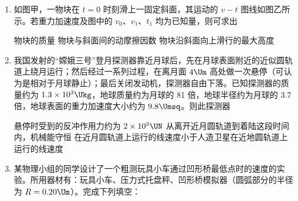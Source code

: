\documentclass[\gkver]{gaokaozhenti}
\begin{document}
\begin{enumerate}
\onepicture[w=3.25cm]{}

{圆盘内的涡电流产生的磁场导致磁针转动}
{在圆盘转动的过程中，磁针的磁场穿过整个圆盘的磁通量发生了变化}
{圆盘中的自由电子随圆盘一起运动形成电流，此电流产生的磁场导致磁针转动}


\item
如图甲，一物块在 $t=0$ 时刻滑上一固定斜面，其运动的 $v-t$ 图线如图乙所示。若重力加速度及图中的 $v_{0}$、$v_{1}$、$t_{1}$ 均为已知量，则可求出

\twopicture[numA={甲}, numB={乙}, labelA=2015全国课标Ⅰ20a, labelB=2015全国课标Ⅰ20b, wA=2.81cm, wB=3.51cm]
{}
{}

{物块的质量}
{物块与斜面间的动摩擦因数}
{物块沿斜面向上滑行的最大高度}


\item
我国发射的“嫦娥三号”登月探测器靠近月球后，先在月球表面附近的近似圆轨道上绕月运行；然后经过一系列过程，在离月面 $4\Um$ 高处做一次悬停（可认为是相对于月球静止）；最后关闭发动机，探测器自由下落。已知探测器的质量约为 $1.3\times10^{3}\Ukg$，地球质量约为月球的 81 倍，地球半径约为月球的 3.7 倍，地球表面的重力加速度大小约为 $9.8\Umsq$。则此探测器

{悬停时受到的反冲作用力约为 $2\times10^{3}\UN$}
{从离开近月圆轨道到着陆这段时间内，机械能守恒}
{在近月圆轨道上运行的线速度小于人造卫星在近地圆轨道上运行的线速度}


\item
某物理小组的同学设计了一个粗测玩具小车通过凹形桥最低点时的速度的实验。所用器材有：玩具小车、压力式托盘秤、凹形桥模拟器（圆弧部分的半径为 $R=0.20\Um$）。完成下列填空：


\end{enumerate}
\end{document}
